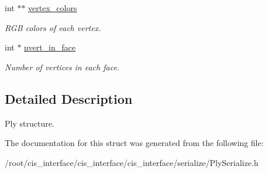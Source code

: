 \begin{DoxyCompactItemize}
\mbox{\label{structply__t_a8070ee061d8bc3ae6067aaa52310c0fa}} 
int $\ast$$\ast$ \mbox{\hyperlink{structply__t_a8070ee061d8bc3ae6067aaa52310c0fa}{vertex\+\_\+colors}}
\begin{DoxyCompactList}\small\item\em R\+GB colors of each vertex. \end{DoxyCompactList}\item 
\mbox{\label{structply__t_acb3aaad9679629140b24855a262d5cf8}} 
int $\ast$ \mbox{\hyperlink{structply__t_acb3aaad9679629140b24855a262d5cf8}{nvert\+\_\+in\+\_\+face}}
\begin{DoxyCompactList}\small\item\em Number of vertices in each face. \end{DoxyCompactList}\end{DoxyCompactItemize}


\subsection{Detailed Description}
Ply structure. 

The documentation for this struct was generated from the following file\+:\begin{DoxyCompactItemize}
\item 
/root/cis\+\_\+interface/cis\+\_\+interface/cis\+\_\+interface/serialize/Ply\+Serialize.\+h\end{DoxyCompactItemize}
